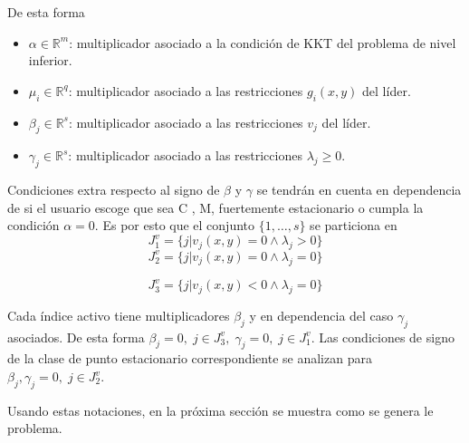 De esta forma  
\begin{itemize}\item$ \alpha\in \mathbb{R}^m  $: multiplicador asociado a la condición de KKT del problema de nivel inferior.                                                                                                     
       \item  $\mu_i \in \mathbb{R}^q$:  multiplicador asociado a las restricciones  $g_i(x,y)$ del líder.  \item        $ \beta_j\in \mathbb{R}^s  $:              multiplicador asociado  a las restricciones   $v_{j}$ del líder.          
   \item        $\gamma_j\in \mathbb{R}^s$:            multiplicador asociado a las  restricciones  $\lambda_j \geq 0$.\end{itemize}



Condiciones extra respecto al signo de $\beta$ y $\gamma$ se tendrán en cuenta en dependencia de si el usuario escoge que sea  C , M, fuertemente estacionario o cumpla  la condición $\alpha=0$.  Es por esto que el conjunto $\{1,\ldots, s\}$  se particiona en 
 \begin{equation} 
 J_1^v=\{j | v_j(x,y)=0 \land \lambda_j>0 \} %
 \label{J_0_lambda_pos_level_inferior}
 \end{equation} 
 \begin{equation}
    J_2^v=\{j | v_j(x,y)=0 \land \lambda_j=0 \}
    \label{J_0_lambda_0_level_inferior}
\end{equation}
                  
 \begin{equation}
    J_3^v=\{j | v_j(x,y)< 0 \land \lambda_j=0 \}
    \label{J_neg_lambda_0_level_inferior}
\end{equation}
            
    
Cada índice activo tiene multiplicadores $\beta_j$ y en dependencia del caso $\gamma_j$ asociados. De esta forma 
$\beta_j= 0,\; j\in  J_3^v,\; \gamma_j= 0,\; j\in J_1^v.$  Las condiciones de signo de la clase de punto estacionario correspondiente se analizan para $\beta_j, \gamma_j= 0,\; j\in J_2^v.$
       

Usando estas notaciones, en la próxima sección se muestra como se genera le problema.



